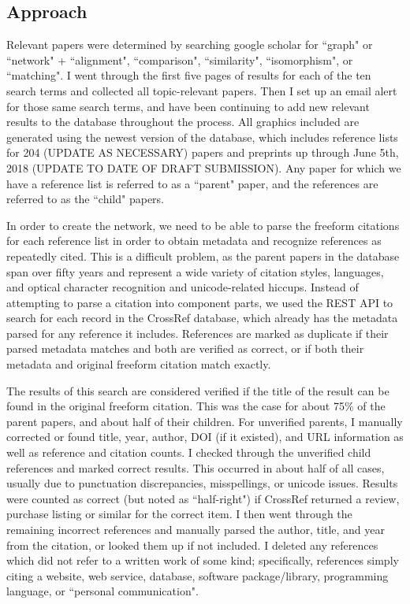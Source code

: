 \documentclass[12pt]{thesis}
\theoremstyle{plain}
\theoremstyle{definition}
\theoremstyle{remark}
\begin{document}
\subsection{Approach}

Relevant papers were determined by searching google scholar for ``graph" or ``network" +  ``alignment", ``comparison", ``similarity", ``isomorphism", or ``matching". I went through the first five pages of results for each of the ten search terms and collected all topic-relevant papers. Then I set up an email alert for those same search terms, and have been continuing to add new relevant results to the database throughout the process. All graphics included are generated using the newest version of the database, which includes reference lists for 204 (UPDATE AS NECESSARY) papers and preprints up through June 5th, 2018 (UPDATE TO DATE OF DRAFT SUBMISSION). Any paper for which we have a reference list is referred to as a ``parent" paper, and the references are referred to as the ``child" papers. 

In order to create the network, we need to be able to parse the freeform citations for each reference list in order to obtain metadata and recognize references as repeatedly cited. This is a difficult problem, as the parent papers in the database span over fifty years and represent a wide variety of citation styles, languages, and optical character recognition and unicode-related hiccups. Instead of attempting to parse a citation into component parts, we used the REST API to search for each record in the CrossRef database, which already has the metadata parsed for any reference it includes. References are marked as duplicate if their parsed metadata matches and both are verified as correct, or if both their metadata and original freeform citation match exactly. 

The results of this search are considered verified if the title of the result can be found in the original freeform citation. This was the case for about 75\% of the parent papers, and about half of their children. For unverified parents, I manually corrected or found title, year, author, DOI (if it existed), and URL information as well as reference and citation counts. I checked through the unverified child references and marked correct results. This occurred in about half of all cases, usually due to punctuation discrepancies, misspellings, or unicode issues. Results were counted as correct (but noted as ``half-right") if CrossRef returned a review, purchase listing or similar for the correct item. I then went through the remaining incorrect references and manually parsed the author, title, and year from the citation, or looked them up if not included. I deleted any references which did not refer to a written work of some kind; specifically, references simply citing a website, web service, database, software package/library, programming language, or ``personal communication".
\end{document}
